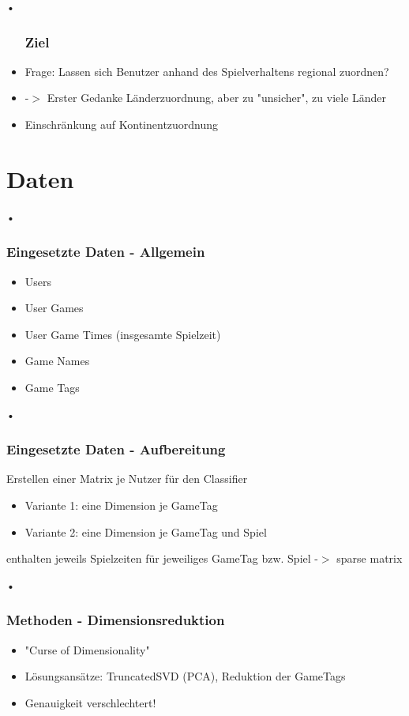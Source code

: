 \documentclass[12pt]{beamer}
\begin{document}
\begin{frame}{•}
\begin{itemize}
\frametitle{Ziel}
\item Frage: Lassen sich Benutzer anhand des Spielverhaltens regional zuordnen?
\item -$>$ Erster Gedanke Länderzuordnung, aber zu "unsicher", zu viele Länder
\item Einschränkung auf Kontinentzuordnung
\end{itemize}
\end{frame}

\section{Daten}
\begin{frame}{•}
\frametitle{Eingesetzte Daten - Allgemein}
\begin{itemize}
\item Users
\item User Games
\item User Game Times (insgesamte Spielzeit)
\item Game Names
\item Game Tags
\end{itemize}
\end{frame}

\begin{frame}{•}
	\frametitle{Eingesetzte Daten - Aufbereitung}
	Erstellen einer Matrix je Nutzer für den Classifier
	\begin{itemize}
		\item Variante 1: eine Dimension je GameTag
		\item Variante 2: eine Dimension je GameTag und Spiel
	\end{itemize}
	enthalten jeweils Spielzeiten für jeweiliges GameTag bzw. Spiel
	-$>$ sparse matrix
	
\end{frame}



\begin{frame}{•}
\frametitle{Methoden - Dimensionsreduktion}
\begin{itemize}
\item "Curse of Dimensionality"
\item Lösungsansätze: TruncatedSVD (PCA), Reduktion der GameTags
\item Genauigkeit verschlechtert!
\end{itemize}

\end{frame}
\end{document}
